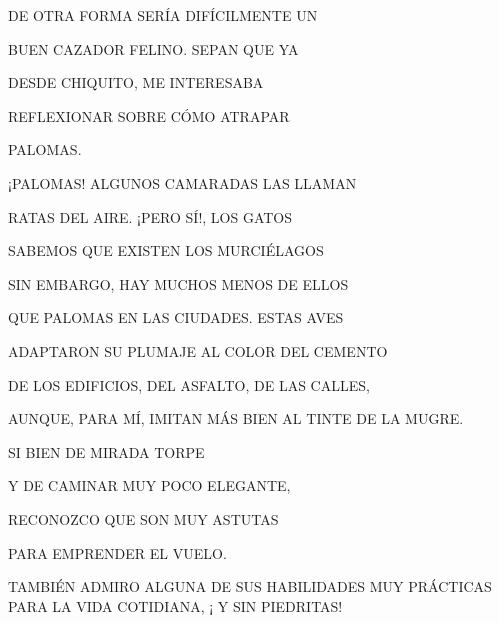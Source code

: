 DE OTRA FORMA SERÍA DIFÍCILMENTE UN 

BUEN CAZADOR FELINO. SEPAN QUE YA				

DESDE CHIQUITO, ME INTERESABA 

REFLEXIONAR 			 
SOBRE CÓMO ATRAPAR 

PALOMAS.

¡PALOMAS! ALGUNOS CAMARADAS LAS 
LLAMAN 			

RATAS DEL AIRE.   
¡PERO SÍ!, LOS 
GATOS 

SABEMOS QUE  			 
EXISTEN LOS			 
MURCIÉLAGOS

SIN EMBARGO, HAY MUCHOS MENOS  	DE ELLOS 

QUE  PALOMAS EN LAS CIUDADES. ESTAS AVES			

ADAPTARON SU PLUMAJE  AL COLOR 	DEL CEMENTO 

DE LOS EDIFICIOS,  DEL ASFALTO, DE LAS CALLES, 

AUNQUE, PARA MÍ, IMITAN MÁS BIEN AL TINTE DE LA MUGRE.	

\newpage
{}
SI BIEN DE MIRADA TORPE 

Y DE CAMINAR MUY POCO ELEGANTE, 
\newline\newline\newline

RECONOZCO QUE SON MUY ASTUTAS

PARA EMPRENDER EL VUELO.
\newline\newline
\begin{flushright}
	\begin{minipage}[r]{.5\textwidth}
		TAMBIÉN ADMIRO ALGUNA DE SUS HABILIDADES MUY PRÁCTICAS PARA LA VIDA COTIDIANA, ¡ Y SIN PIEDRITAS!
	\end{minipage}
\end{flushright}	








